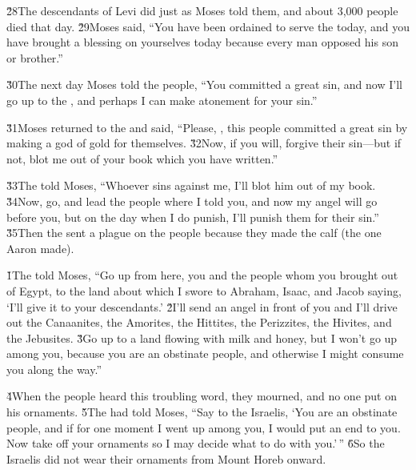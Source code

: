 \v{28}The descendants of Levi did just as Moses told them, and about 3,000 people died that day. \v{29}Moses said, ``You have been ordained to serve the  today, and you have brought a blessing on yourselves today because every man opposed his son or brother.''

\v{30}The next day Moses told the people, ``You committed a great sin, and now I'll go up to the , and perhaps I can make atonement for your sin.''

\v{31}Moses returned to the  and said, ``Please, , this people committed a great sin by making a god of gold for themselves. \v{32}Now, if you will, forgive their sin---but if not, blot me out of your book which you have written.''

\v{33}The  told Moses, ``Whoever sins against me, I'll blot him out of my book. \v{34}Now, go, and lead the people where I told you, and now my angel will go before you, but on the day when I do punish, I'll punish them for their sin.'' \v{35}Then the  sent a plague on the people because they made the calf (the one Aaron made).

\v{1}The  told Moses, ``Go up from here, you and the people whom you brought out of Egypt, to the land about which I swore to Abraham, Isaac, and Jacob saying, `I'll give it to your descendants.' \v{2}I'll send an angel in front of you and I'll drive out the Canaanites, the Amorites, the Hittites, the Perizzites, the Hivites, and the Jebusites. \v{3}Go up to a land flowing with milk and honey, but I won't go up among you, because you are an obstinate people, and otherwise I might consume you along the way.''

\v{4}When the people heard this troubling word, they mourned, and no one put on his ornaments. \v{5}The  had told Moses, ``Say to the Israelis, `You are an obstinate people, and if for one moment I went up among you, I would put an end to you. Now take off your ornaments so I may decide what to do with you.'\,'' \v{6}So the Israelis did not wear their ornaments from Mount Horeb onward.

